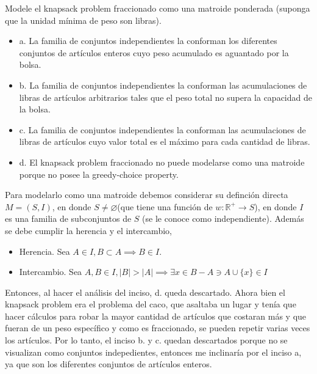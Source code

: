 \begin{problema}
\begin{sol}
    \end{sol}
\end{problema}

\begin{problema}
    Modele el knapsack problem fraccionado como una matroide ponderada (suponga que la unidad mínima de peso son libras).
    \begin{itemize}
        \item a. La familia de conjuntos independientes la conforman los diferentes conjuntos de artículos enteros cuyo peso acumulado es aguantado por la bolsa.
        \item b. La familia de conjuntos independientes la conforman las acumulaciones de libras de artículos arbitrarios tales que el peso total no supera la capacidad de la bolsa.
        \item c. La familia de conjuntos independientes la conforman las acumulaciones de libras de artículos cuyo valor total es el máximo para cada cantidad de libras.
        \item d. El knapsack problem fraccionado no puede modelarse como una matroide porque no posee la greedy-choice property.
    \end{itemize}
    \begin{sol}
        Para modelarlo como una matroide debemos considerar su definción directa $M=(S,I)$, en donde $S\neq \varnothing$(que tiene una función de $w:\mathbb{R}^+\to S$), en donde $I$ es una familia de subconjuntos de $S$ (se le conoce como independiente). Además se debe cumplir la herencia y el intercambio, 
        \begin{itemize}
            \item Herencia. Sea $A\in I, B\subset A\implies B\in I$. 
            \item Intercambio. Sea $A,B\in I, |B|>|A|\implies \exists x\in B-A\ni A\cup \{x\}\in I$
        \end{itemize}
        Entonces, al hacer el análisis del inciso, d. queda descartado. Ahora bien el knapsack problem era el problema del caco, que asaltaba un lugar y tenía que hacer cálculos para robar la mayor cantidad de artículos que costaran más y que fueran de un peso específico y como es fraccionado, se pueden repetir varias veces los artículos. Por lo tanto, el inciso b. y c. quedan descartados porque no se visualizan como conjuntos indepedientes, entonces me inclinaría por el inciso a, ya que son los diferentes conjuntos de artículos enteros. 
    \end{sol}
\end{problema}

%
%

